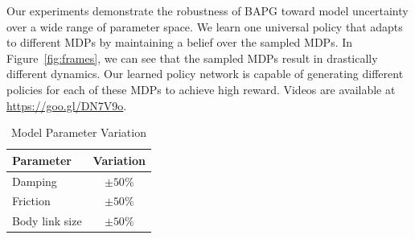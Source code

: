 \documentclass{article}
\newcommand{\figref}[1]{Figure~\ref{#1}}%
\begin{document}
Our experiments demonstrate the robustness of BAPG toward model uncertainty over a wide range of parameter space.
We learn one universal policy that adapts to different MDPs by maintaining a belief over the sampled MDPs.
In \figref{fig:frames}, we can see that the sampled MDPs result in drastically different dynamics.
Our learned policy network is capable of generating different policies for each of these MDPs to achieve high reward.
Videos are available at \url{https://goo.gl/DN7V9o}.

\begin{table}[ht]
\centering
\begin{tabular}{l c} %
\hline\hline %
Parameter & Variation \\ %
\hline %
Damping & $\pm50\%$\\
Friction & $\pm50\%$\\
Body link size & $\pm50\%$\\%
\hline %
\end{tabular}
\bigskip
\caption{Model Parameter Variation}
\label{table:physicsParams}
\end{table}
\end{document}
